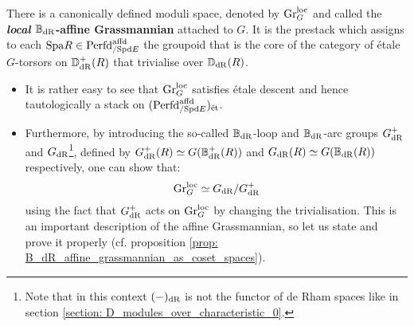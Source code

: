                 \begin{definition} \label{def: local_B_dR_affine_grassmannian}
                    There is a canonically defined moduli space, denoted by $\mathrm{Gr}_G^{\mathrm{loc}}$ and called the \textbf{\textit{local} $\mathbb{B}_{\mathrm{dR}}$-affine Grassmannian} attached to $G$. It is the prestack which assigns to each $\mathrm{Spa} R \in \mathrm{Perfd}_{/\mathrm{Spd} E}^{\mathrm{affd}}$ the groupoid that is the core of the category of \'etale $G$-torsors on $\mathbb{D}_{\mathrm{dR}}^+(R)$ that trivialise over $\mathbb{D}_{\mathrm{dR}}(R)$.  
                \end{definition}
                \begin{remark}
                    \noindent
                    \begin{itemize}
                        \item It is rather easy to see that $\mathrm{Gr}_G^{\mathrm{loc}}$ satisfies \'etale descent and hence tautologically a stack on $(\mathrm{Perfd}^{\mathrm{affd}}_{/\mathrm{Spd} E})_{\mathrm{\acute{e}t}}$.
                        \item Furthermore, by introducing the so-called $\mathbb{B}_{\mathrm{dR}}$-loop and $\mathbb{B}_{\mathrm{dR}}$-arc groups $G_{\mathrm{dR}}^+$ and $G_{\mathrm{dR}}$\footnote{Note that in this context $(-)_{\mathrm{dR}}$ is not the functor of de Rham spaces like in section \ref{section: D_modules_over_characteristic_0}.}, defined by $G_{\mathrm{dR}}^+(R) \simeq G(\mathbb{B}_{\mathrm{dR}}^+(R))$ and $G_{\mathrm{dR}}(R) \simeq G(\mathbb{B}_{\mathrm{dR}}(R))$ respectively, one can show that:
                            $$\mathrm{Gr}_G^{\mathrm{loc}} \simeq G_{\mathrm{dR}}/G_{\mathrm{dR}}^+$$
                        using the fact that $G_{\mathrm{dR}}^+$ acts on $\mathrm{Gr}_G^{\mathrm{loc}}$ by changing the trivialisation. This is an important description of the affine Grassmannian, so let us state and prove it properly (cf. proposition \ref{prop: B_dR_affine_grassmannian_as_coset_spaces}).
                    \end{itemize}
                \end{remark}
                
